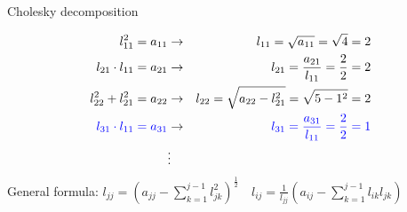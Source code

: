 \documentclass[11pt,compress,t,notes=noshow, xcolor=table]{beamer}
\begin{document}
\begin{frame}{Cholesky decomposition}
\begin{enumerate}
{\vspace*{-0.4cm}
\begin{eqnarray*}
l_{11}^2 = a_{11} &\rightarrow& l_{11} = \sqrt{a_{11}} = \sqrt{4} = 2 \\
l_{21} \cdot l_{11} = a_{21} &\rightarrow& l_{21} = \frac{a_{21}}{l_{11}}  = \frac{2}{2} = 2 \\
l_{22}^2 + l_{21}^2 = a_{22} &\rightarrow& l_{22} = \sqrt{a_{22} - l_{21}^2} = \sqrt{5 - 1^2} = 2 \\
\textcolor{blue}{l_{31} \cdot l_{11} = a_{31}}  &\rightarrow& \textcolor{blue}{l_{31} = \frac{a_{31}}{l_{11}} = \frac{2}{2} = 1 } \\
&\vdots &
\end{eqnarray*}
General formula: $ l_{jj} = \left(a_{jj} - \sum_{k = 1}^{j - 1}l_{jk}^2\right)^{\frac{1}{2}} \quad
l_{ij} = \frac{1}{l_{jj}}\left(a_{ij} - \sum_{k = 1}^{j - 1}l_{ik}l_{jk}\right)$
}

\normalsize
\end{enumerate}

\end{frame}
\end{document}
